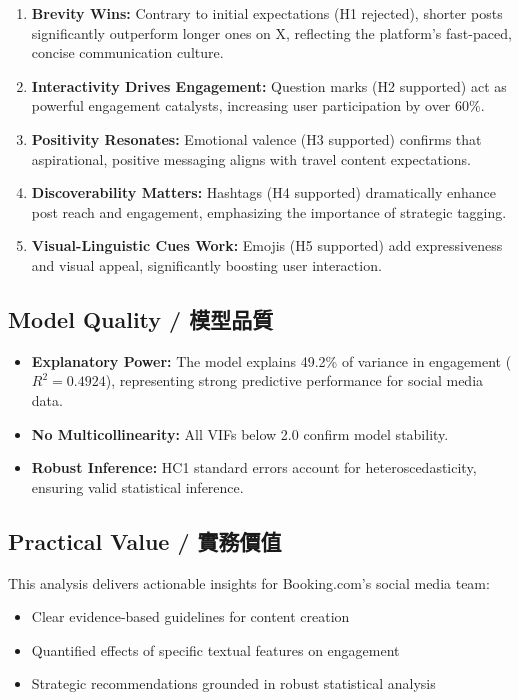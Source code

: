 \documentclass[12pt,a4paper,fontset=none]{ctexart}
\begin{document}
\begin{enumerate}
    \item \textbf{Brevity Wins:} Contrary to initial expectations (H1 rejected), shorter posts significantly outperform longer ones on X, reflecting the platform's fast-paced, concise communication culture.

    \item \textbf{Interactivity Drives Engagement:} Question marks (H2 supported) act as powerful engagement catalysts, increasing user participation by over 60\%.

    \item \textbf{Positivity Resonates:} Emotional valence (H3 supported) confirms that aspirational, positive messaging aligns with travel content expectations.

    \item \textbf{Discoverability Matters:} Hashtags (H4 supported) dramatically enhance post reach and engagement, emphasizing the importance of strategic tagging.

    \item \textbf{Visual-Linguistic Cues Work:} Emojis (H5 supported) add expressiveness and visual appeal, significantly boosting user interaction.
\end{enumerate}

\subsection{Model Quality / 模型品質}

\begin{itemize}
    \item \textbf{Explanatory Power:} The model explains 49.2\% of variance in engagement ($R^2 = 0.4924$), representing strong predictive performance for social media data.

    \item \textbf{No Multicollinearity:} All VIFs below 2.0 confirm model stability.

    \item \textbf{Robust Inference:} HC1 standard errors account for heteroscedasticity, ensuring valid statistical inference.
\end{itemize}

\subsection{Practical Value / 實務價值}

This analysis delivers actionable insights for Booking.com's social media team:
\begin{itemize}
    \item Clear evidence-based guidelines for content creation
    \item Quantified effects of specific textual features on engagement
    \item Strategic recommendations grounded in robust statistical analysis
\end{itemize}
\end{document}
